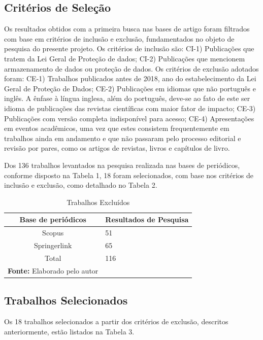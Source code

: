\subsection{Critérios de Seleção} 

Os resultados obtidos com a primeira busca nas bases de artigo foram filtrados com base em critérios de inclusão e exclusão, fundamentados no objeto de pesquisa do presente projeto. Os critérios de inclusão são: CI-1) Publicações que tratem da Lei Geral de Proteção de dados; CI-2) Publicações que mencionem armazenamento de dados ou proteção de dados. Os critérios de exclusão adotados foram: CE-1) Trabalhos publicados antes de 2018, ano do estabelecimento da Lei Geral de Proteção de Dados; CE-2) Publicações em idiomas que não português e inglês. A ênfase à língua inglesa, além do português, deve-se ao fato de este ser idioma de publicações das revistas científicas com maior fator de impacto; CE-3) Publicações com versão completa indisponível para acesso; CE-4) Apresentações em eventos acadêmicos, uma vez que estes consistem frequentemente em trabalhos ainda em andamento e que não passaram pelo processo editorial e revisão por pares, como os artigos de revistas, livros e capítulos de livro.

Dos 136 trabalhos levantados na pesquisa realizada nas bases de periódicos, conforme disposto na Tabela 1, 18 foram selecionados, com base nos critérios de inclusão e exclusão, como detalhado no Tabela 2. 

\begin{table}
  \caption{Trabalhos Excluídos}
  \label{tab:freq}
  \begin{tabular}{cl}
    \toprule
    Base de periódicos&Resultados de Pesquisa\\
    \midrule 
     Scopus                &        51      \\
     Springerlink      &       65\\
  \bottomrule
   Total                    &       116\\
\bottomrule
\textbf{\textbf{Fonte: }}Elaborado pelo autor
\end{tabular}
\end{table}

\subsection{Trabalhos Selecionados} 

Os 18 trabalhos selecionados a partir dos critérios de exclusão, descritos anteriormente, estão listados na Tabela 3. 


